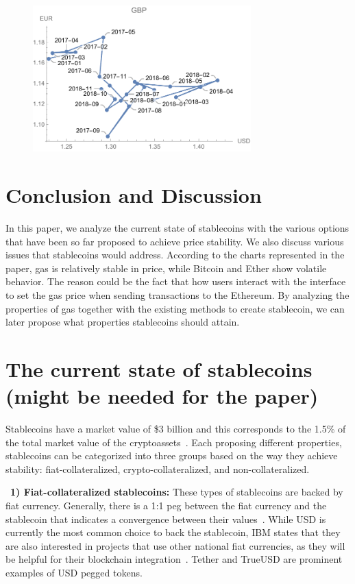 \begin{figure}[!htb]
	\centering
	\includegraphics[width=0.75\textwidth]{figures/gbpEURUSD.pdf}
	\caption{\label{fig:gbp1}}
\end{figure}
\section{Conclusion and Discussion}
In this paper, we analyze the current state of stablecoins with the various options that have been so far proposed to achieve price stability. We also discuss various issues that stablecoins would address. According to the charts represented in the paper, gas is relatively stable in price, while Bitcoin and Ether show volatile behavior. The reason could be the fact that how users interact with the interface to set the gas price when sending transactions to the Ethereum. By analyzing the properties of gas together with the existing methods to create stablecoin, we can later propose what properties stablecoins should attain.

\section{The current state of stablecoins (might be needed for the paper)}

Stablecoins have a market value of \$3 billion and this corresponds to the 1.5\% of the total market value of the cryptoassets~\cite{report}. Each proposing different properties, stablecoins can be categorized into three groups based on the way they achieve stability: fiat-collateralized, crypto-collateralized, and non-collateralized.

~\textbf{1) Fiat-collateralized stablecoins:} These types of stablecoins are backed by fiat currency. Generally, there is a 1:1 peg between the fiat currency and the stablecoin that indicates a convergence between their values~\cite{linkedin}. While USD is currently the most common choice to back the stablecoin, IBM states that they are also interested in projects that use other national fiat currencies, as they will be helpful for their blockchain integration~\cite{cointelegraph}. Tether and TrueUSD are prominent examples of USD pegged tokens.


